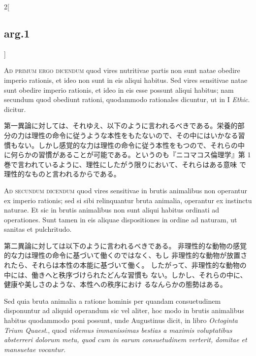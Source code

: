 \documentclass[paper=a4paper,fontsize=10pt,jafontsize=9pt,titlepage]{jlreq}
\begin{document}
\begin{paracol}{2}[\subsection{arg.1}]
\switchcolumn*[\subsection{ad.1}]

{\scshape Ad primum ergo dicendum} quod vires nutritivae partis non sunt natae
 obedire imperio rationis, et ideo non sunt in eis aliqui habitus. Sed
 vires sensitivae natae sunt obedire imperio rationis, et ideo in eis
 esse possunt aliqui habitus; nam secundum quod obediunt rationi,
 quodammodo rationales dicuntur, ut in I {\itshape Ethic}. dicitur.

\switchcolumn

第一異論に対しては、それゆえ、以下のように言われるべきである。栄養的部
分の力は理性の命令に従うような本性をもたないので、その中にはいかなる習
慣もない。しかし感覚的な力は理性の命令に従う本性をもつので、それらの中
に何らかの習慣があることが可能である。というのも『ニコマコス倫理学』第
1巻で言われているように、理性にしたがう限りにおいて、それらはある意味
で理性的なものと言われるからである。

\switchcolumn*[\subsection{ad.2}]

{\scshape Ad secundum dicendum} quod vires sensitivae in brutis
animalibus non operantur ex imperio rationis; sed si sibi relinquantur
bruta animalia, operantur ex instinctu naturae. Et sic in brutis
animalibus non sunt aliqui habitus ordinati ad operationes. Sunt tamen
in eis aliquae dispositiones in ordine ad naturam, ut sanitas et
pulchritudo.

\switchcolumn

第二異論に対しては以下のように言われるべきである。
非理性的な動物の感覚的な力は理性の命令に基づいて働くのではなく、もし
非理性的な動物が放置されたら、それらは本性の本能に基づいて働く。
したがって、非理性的な動物の中には、働きへと秩序づけられたどんな習慣も
 ない。しかし、それらの中に、健康や美しさのような、本性への秩序におけ
 るなんらかの態勢はある。

\switchcolumn*

Sed quia bruta animalia a ratione hominis per quandam consuetudinem
disponuntur ad aliquid operandum sic vel aliter, hoc modo in brutis
animalibus habitus quodammodo poni possunt, unde Augustinus dicit, in
libro {\itshape Octoginta Trium Quaest}., quod {\itshape videmus
immanissimas bestias a maximis voluptatibus absterreri dolorum metu,
quod cum in earum consuetudinem verterit, domitae et mansuetae
vocantur}.


\end{paracol}
\end{document}
